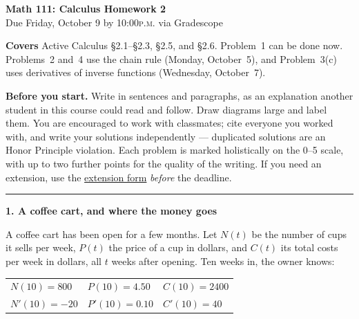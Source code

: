 \documentclass[11pt]{article}
\newcommand{\prob}[1]{\medskip\noindent\textbf{\large #1}\par\smallskip}
\begin{document}
\begin{center}
{\Large\bfseries Math 111: Calculus \quad Homework 2}\\[4pt]
{Due Friday, October 9 by 10:00\textsc{p.m.} via Gradescope}
\end{center}

\medskip
\noindent\textbf{Covers} Active Calculus \S2.1--\S2.3, \S2.5, and \S2.6. Problem~1 can be
done now. Problems~2 and~4 use the chain rule (Monday, October~5), and Problem~3(c) uses
derivatives of inverse functions (Wednesday, October~7).

\smallskip
\noindent\textbf{Before you start.} Write in sentences and paragraphs, as an
explanation another student in this course could read and follow. Draw diagrams large
and label them. You are encouraged to work with classmates; cite everyone you worked
with, and write your solutions independently --- duplicated solutions are an Honor
Principle violation. Each problem is marked holistically on the 0--5 scale, with up
to two further points for the quality of the writing. If you need an extension, use
the \href{https://docs.google.com/forms/d/e/1FAIpQLSfIfgx44SFtUzefTNr-80yz35MVJaUqQttt96xVTU5mCQCOgg/viewform}{extension
form} \emph{before} the deadline.

\bigskip\hrule\bigskip

\prob{1. A coffee cart, and where the money goes}

A coffee cart has been open for a few months. Let $N(t)$ be the number of cups it sells
per week, $P(t)$ the price of a cup in dollars, and $C(t)$ its total costs per week in
dollars, all $t$ weeks after opening. Ten weeks in, the owner knows:

\smallskip
\begin{center}
\begin{tabular}{@{}lll@{}}
\toprule
$N(10) = 800$ & $P(10) = 4.50$ & $C(10) = 2400$ \\
$N'(10) = -20$ & $P'(10) = 0.10$ & $C'(10) = 40$ \\
\bottomrule
\end{tabular}
\end{center}
\smallskip
\end{document}
